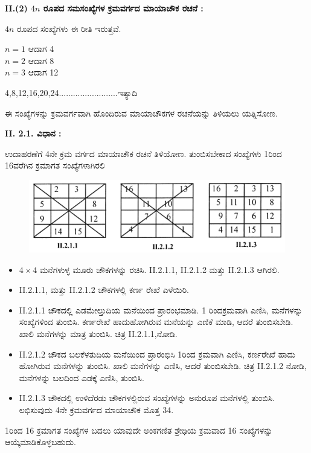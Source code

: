 \smallskip
\noindent
\textbf{II.(2) $4n$ ರೂಪದ ಸಮಸಂಖ್ಯೆಗಳ ಕ್ರಮವರ್ಗದ ಮಾಯಾಚೌಕ ರಚನೆ :}
\smallskip

$4n$ ರೂಪದ ಸಂಖ್ಯೆಗಳು ಈ ರೀತಿ ಇರುತ್ತವೆ.
\begin{center}
$n=1$ ಆದಾಗ 4\\
$n=2$ ಆದಾಗ 8\\
$n=3$ ಆದಾಗ 12
\end{center}
4,8,12,16,20,24.........................ಇತ್ಯಾದಿ

ಈ ಸಂಖ್ಯೆಗಳನ್ನು ಕ್ರಮವರ್ಗವಾಗಿ ಹೊಂದಿರುವ ಮಾಯಾಚೌಕಗಳ ರಚನೆಯನ್ನು ತಿಳಿಯಲು ಯತ್ನಿಸೋಣ.

\textbf{II. 2.1. ವಿಧಾನ :}

ಉದಾಹರಣೆಗೆ 4ನೇ ಕ್ರಮ ವರ್ಗದ ಮಾಯಾಚೌಕ ರಚನೆ ತಿಳಿಯೋಣ. ತುಂಬಿಸಬೇಕಾದ ಸಂಖ್ಯೆಗಳು 1ರಿಂದ 16ವರೆಗಿನ ಕ್ರಮಾಗತ ಸಂಖ್ಯೆಗಳಾಗಿರಲಿ

\newpage

\begin{figure}[H]
\includegraphics[scale=.8]{src/figures/chap3/fig3.16.jpg}
\end{figure}

\begin{itemize}
	\item $4 \times 4$ ಮನೆಗಳುಳ್ಳ ಮೂರು ಚೌಕಗಳನ್ನು ರಚಿಸಿ. II.2.1.1, II.2.1.2 ಮತ್ತು II.2.1.3 ಆಗಿರಲಿ.
	\item II.2.1.1, ಮತ್ತು II.2.1.2 ಚೌಕಗಳಲ್ಲಿ ಕರ್ಣ ರೇಖೆ ಎಳೆಯಿರಿ.
	\item II.2.1.1 ಚೌಕದಲ್ಲಿ ಎಡಮೇಲ್ತುದಿಯ ಮನೆಯಿಂದ ಪ್ರಾರಂಭಮಾಡಿ. 1 ರಿಂದ\break ಕ್ರಮವಾಗಿ ಎಣಿಸಿ, ಮನೆಗಳನ್ನು ಸಂಖ್ಯೆಗಳಿಂದ ತುಂಬಿಸಿ. ಕರ್ಣರೇಖೆ ಹಾದು\-ಹೋಗಿರುವ ಮನೆಯನ್ನು ಎಣಿಕೆ ಮಾಡಿ, ಆದರೆ ತುಂಬಿಸಬೇಡಿ. ಖಾಲಿ ಮನೆಗಳನ್ನು ಮಾತ್ರ ತುಂಬಿಸಿ. ಚಿತ್ರ II.2.1.1,ನೋಡಿ.
	\item II.2.1.2 ಚೌಕದ ಬಲಕೆಳತುದಿಯ ಮನೆಯಿಂದ ಪ್ರಾರಂಭಿಸಿ 1ರಿಂದ ಕ್ರಮವಾಗಿ ಎಣಿಸಿ, ಕರ್ಣರೇಖೆ ಹಾದು ಹೋಗಿರುವ ಮನೆಗಳನ್ನು ತುಂಬಿಸಿ. ಖಾಲಿ ಮನೆ\-ಗಳನ್ನು ಎಣಿಸಿ, ಆದರೆ ತುಂಬಿಸಬೇಡಿ. ಚಿತ್ರ II.2.1.2 ನೋಡಿ, ಮನೆಗಳನ್ನು ಬಲದಿಂದ ಎಡಕ್ಕೆ ಎಣಿಸಿ, ತುಂಬಿಸಿ.
	\item II.2.1.3 ಚೌಕದಲ್ಲಿ ಉಳಿದೆರಡು ಚೌಕಗಳಲ್ಲಿರುವ ಸಂಖ್ಯೆಗಳನ್ನು ಅನುರೂಪ ಮನೆಗಳಲ್ಲಿ ತುಂಬಿಸಿ. ಲಭಿಸುವುದು 4ನೇ ಕ್ರಮವರ್ಗದ ಮಾಯಾಚೌಕ ಮೊತ್ತ 34.
\end{itemize}

1ರಿಂದ 16 ಕ್ರಮಾಗತ ಸಂಖ್ಯೆಗಳ ಬದಲು ಯಾವುದೇ ಅಂಕಗಣಿತ ಶ್ರೇಢಿಯ ಕ್ರಮವಾದ 16 ಸಂಖ್ಯೆಗಳನ್ನು ಆಯ್ಕೆಮಾಡಿಕೊಳ್ಳಬಹುದು.

